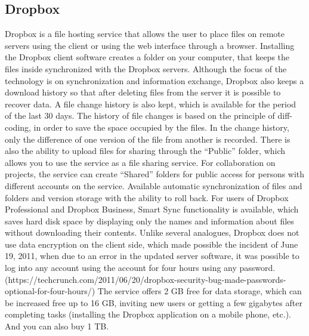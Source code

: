 \subsection{Dropbox}
Dropbox is a file hosting service that allows the user to place files on remote servers using the client or using the web interface through a browser. Installing the Dropbox client software creates a folder on your computer, that keeps the files inside synchronized with the Dropbox servers. Although the focus of the technology is on synchronization and information exchange, Dropbox also keeps a download history so that after deleting files from the server it is possible to recover data. A file change history is also kept, which is available for the period of the last 30 days.
The history of file changes is based on the principle of diff-coding, in order to save the space occupied by the files. In the change history, only the difference of one version of the file from another is recorded. There is also the ability to upload files for sharing through the “Public” folder, which allows you to use the service as a file sharing service. For collaboration on projects, the service can create “Shared” folders for public access for persons with different accounts on the service. Available automatic synchronization of files and folders and version storage with the ability to roll back. For users of Dropbox Professional and Dropbox Business, Smart Sync functionality is available, which saves hard disk space by displaying only the names and information about files without downloading their contents.
Unlike several analogues, Dropbox does not use data encryption on the client side, which made possible the incident of June 19, 2011, when due to an error in the updated server software, it was possible to log into any account using the account for four hours using any password. (https://techcrunch.com/2011/06/20/dropbox-security-bug-made-passwords-optional-for-four-hours/)
The service offers 2 GB free for data storage, which can be increased free up to 16 GB, inviting new users or getting a few gigabytes after completing tasks (installing the Dropbox application on a mobile phone, etc.). And you can also buy 1 TB.
